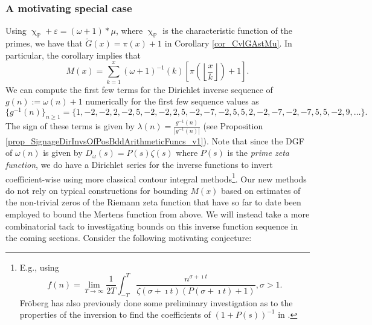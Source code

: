 \documentclass[11pt,reqno,a4letter]{article}
\numberwithin{figure}{section}
\numberwithin{table}{section}
\renewcommand{\chi}{\upchi}
\newcommand{\Floor}[2]{\ensuremath{\left\lfloor \frac{#1}{#2} \right\rfloor}}
\theoremstyle{plain}
\numberwithin{theorem}{section}
\theoremstyle{definition}
\newcommand{\NBRef}[1]{
     \todo[linecolor=green!85!white,backgroundcolor=orange!50!white,bordercolor=blue!30!black,textcolor=cyan!15!black,shadow,size=\small,fancyline]{
     \color{NBRefColor}{\textbf{#1}
     }
     }
}
\begin{document}
\subsubsection{A motivating special case} 
\label{example_InvertingARecRelForMx_Intro}
 
Using $\chi_{\mathbb{P}} + \varepsilon = (\omega + 1) \ast \mu$, 
where $\chi_{\mathbb{P}}$ is the characteristic 
function of the primes, we have that $\widetilde{G}(x) = \pi(x) + 1$ in 
Corollary \ref{cor_CvlGAstMu}. 
In particular, the corollary implies that 
\begin{equation} 
\label{eqn_Mx_gInvnPixk_formula} 
M(x) = \sum_{k=1}^{x} (\omega+1)^{-1}(k) \left[\pi\left(\Floor{x}{k}\right) + 1\right]. 
\end{equation} 
We can compute the first few terms for the
Dirichlet inverse sequence of 
$g(n) := \omega(n) + 1$ numerically for the first few sequence values as 
\[
\{g^{-1}(n)\}_{n \geq 1} = \{1, -2, -2, 2, -2, 5, -2, -2, 2, 5, -2, -7, -2, 5, 5, 2, -2, -7, -2, 
     -7, 5, 5, -2, 9, \ldots \}. 
\] 
The sign of these terms is given by $\lambda(n) = \frac{g^{-1}(n)}{|g^{-1}(n)|}$ 
(see Proposition \ref{prop_SignageDirInvsOfPosBddArithmeticFuncs_v1}). 
Note that since the DGF of $\omega(n)$ is given by 
$D_{\omega}(s) = P(s) \zeta(s)$ where $P(s)$ is the \emph{prime zeta function}, we do have a 
Dirichlet series for the inverse functions to invert coefficient-wise using more classical 
contour integral methods\footnote{
E.g., using \cite[\S 11]{APOSTOLANUMT} 
\[
f(n) = \lim_{T \rightarrow \infty} \frac{1}{2T} \int_{-T}^{T} 
     \frac{n^{\sigma+\imath t}}{\zeta(\sigma+\imath t)(P(\sigma+\imath t) + 1)}, \sigma > 1. 
\]
Fr\"oberg has also previously done some preliminary investigation as to the properties of the 
inversion to find the coefficients of $(1+P(s))^{-1}$ in \cite{FROBERG-1968}. 
}. 
Our new methods do not rely on typical constructions for 
bounding $M(x)$ based on estimates of the non-trivial zeros of the Riemann zeta function that have so far 
to date been employed to bound the Mertens function from above. 
We will instead take a more combinatorial tack to investigating bounds on this inverse function 
sequence in the coming sections. 
Consider the following motivating conjecture: 
\NBRef{A01-2020-04-26}
\end{document}
